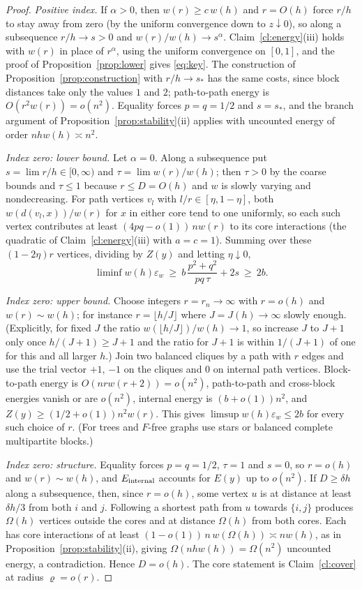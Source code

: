 \documentclass[11pt,a4paper]{article}
\theoremstyle{definition}
\newcommand{\eps}{\varepsilon}
\begin{document}
\begin{proof}
\emph{Positive index.} If $\alpha>0$, then $w(r)\ge c\,w(h)$ and $r=O(h)$ force $r/h$ to stay away from zero (by the uniform convergence down to $z\downarrow0$), so along a subsequence $r/h\to s>0$ and $w(r)/w(h)\to s^\alpha$. Claim~\ref{cl:energy}(iii) holds with $w(r)$ in place of $r^\alpha$, using the uniform convergence on $[0,1]$, and the proof of Proposition~\ref{prop:lower} gives \eqref{eq:key}. The construction of Proposition~\ref{prop:construction} with $r/h\to s_*$ has the same costs, since block distances take only the values $1$ and $2$; path-to-path energy is $O(r^2w(r))=o(n^2)$. Equality forces $p=q=1/2$ and $s=s_*$, and the branch argument of Proposition~\ref{prop:stability}(ii) applies with uncounted energy of order $nhw(h)\asymp n^2$.

\emph{Index zero: lower bound.} Let $\alpha=0$. Along a subsequence put $s=\lim r/h\in[0,\infty)$ and $\tau=\lim w(r)/w(h)$; then $\tau>0$ by the coarse bounds and $\tau\le1$ because $r\le D=O(h)$ and $w$ is slowly varying and nondecreasing. For path vertices $v_l$ with $l/r\in[\eta,1-\eta]$, both $w(d(v_l,x))/w(r)$ for $x$ in either core tend to one uniformly, so each such vertex contributes at least $(4pq-o(1))\,nw(r)$ to its core interactions (the quadratic of Claim~\ref{cl:energy}(iii) with $a=c=1$). Summing over these $(1-2\eta)r$ vertices, dividing by $Z(y)$ and letting $\eta\downarrow0$,
\[
 \liminf w(h)\eps_w\ \ge\ b\,\frac{p^2+q^2}{pq\,\tau}+2s\ \ge\ 2b .
\]

\emph{Index zero: upper bound.} Choose integers $r=r_n\to\infty$ with $r=o(h)$ and $w(r)\sim w(h)$; for instance $r=\lfloor h/J\rfloor$ where $J=J(h)\to\infty$ slowly enough. (Explicitly, for fixed $J$ the ratio $w(\lfloor h/J\rfloor)/w(h)\to1$, so increase $J$ to $J+1$ only once $h/(J+1)\ge J+1$ and the ratio for $J+1$ is within $1/(J+1)$ of one for this and all larger $h$.) Join two balanced cliques by a path with $r$ edges and use the trial vector $+1$, $-1$ on the cliques and $0$ on internal path vertices. Block-to-path energy is $O(nrw(r+2))=o(n^2)$, path-to-path and cross-block energies vanish or are $o(n^2)$, internal energy is $(b+o(1))n^2$, and $Z(y)\ge(1/2+o(1))n^2w(r)$. This gives $\limsup w(h)\eps_w\le2b$ for every such choice of $r$. (For trees and $F$-free graphs use stars or balanced complete multipartite blocks.)

\emph{Index zero: structure.} Equality forces $p=q=1/2$, $\tau=1$ and $s=0$, so $r=o(h)$ and $w(r)\sim w(h)$, and $E_{\rm internal}$ accounts for $E(y)$ up to $o(n^2)$. If $D\ge\delta h$ along a subsequence, then, since $r=o(h)$, some vertex $u$ is at distance at least $\delta h/3$ from both $i$ and $j$. Following a shortest path from $u$ towards $\{i,j\}$ produces $\Omega(h)$ vertices outside the cores and at distance $\Omega(h)$ from both cores. Each has core interactions of at least $(1-o(1))\,n\,w(\Omega(h))\asymp nw(h)$, as in Proposition~\ref{prop:stability}(ii), giving $\Omega(nhw(h))=\Omega(n^2)$ uncounted energy, a contradiction. Hence $D=o(h)$. The core statement is Claim~\ref{cl:cover} at radius $\varrho=o(r)$.
\end{proof}
\end{document}
